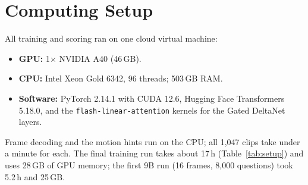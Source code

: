 \section{Computing Setup}
\label{app:setup}
All training and scoring ran on one cloud virtual machine:
\begin{itemize}
\item \textbf{GPU:} 1$\times$ NVIDIA A40 (46\,GB).
\item \textbf{CPU:} Intel Xeon Gold 6342, 96 threads; 503\,GB RAM.
\item \textbf{Software:} PyTorch 2.14.1 with CUDA 12.6, Hugging Face
Transformers 5.18.0, and the \texttt{flash-linear-attention} kernels for
the Gated DeltaNet layers.
\end{itemize}
Frame decoding and the motion hints run on the CPU; all 1,047 clips take
under a minute for each. The final training run takes about 17\,h
(Table~\ref{tab:setup}) and uses 28\,GB of GPU memory; the first 9B run (16
frames, 8,000 questions) took 5.2\,h and 25\,GB.
